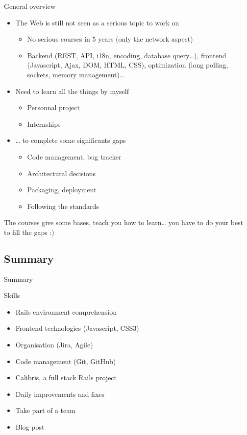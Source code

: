 \documentclass[10pt,a4paper]{beamer}
\begin{document}
\begin{frame}{General overview}
	\begin{itemize}
	  \item The Web is still not seen as a serious topic to work on 
      \begin{itemize}
        \item No serious courses in 5 years (only the network aspect)
        \item Backend (REST, API, i18n, encoding, database query…), frontend (Javascript, Ajax, DOM, HTML, CSS), optimization (long polling, sockets, memory management)…
      \end{itemize}

	  \item Need to learn all the things by myself
      \begin{itemize}
        \item Personnal project 
        \item Internships
      \end{itemize}
      
      \item … to complete some significants gaps
      \begin{itemize}
        \item Code management, bug tracker
        \item Architectural decisions 
        \item Packaging, deployment
        \item Following the standards
      \end{itemize}
	\end{itemize}
	
	The courses give some bases, teach you how to learn… you have to do your best to fill the gaps :)
\end{frame}

\subsection{Summary}

\begin{frame}{Summary}
    \begin{block}{Skills}
    \begin{itemize}
      \item Rails environment comprehension
      \item Frontend technologies (Javascript, CSS3)
      \item Organisation (Jira, Agile)
      \item Code management (Git, GitHub)
    \end{itemize}
  \end{block}
  
  \begin{itemize}
    \item Calibris, a full stack Rails project 
    \item Daily improvements and fixes
    \item Take part of a team
    \item Blog post
  \end{itemize}
\end{frame}
\end{document}
